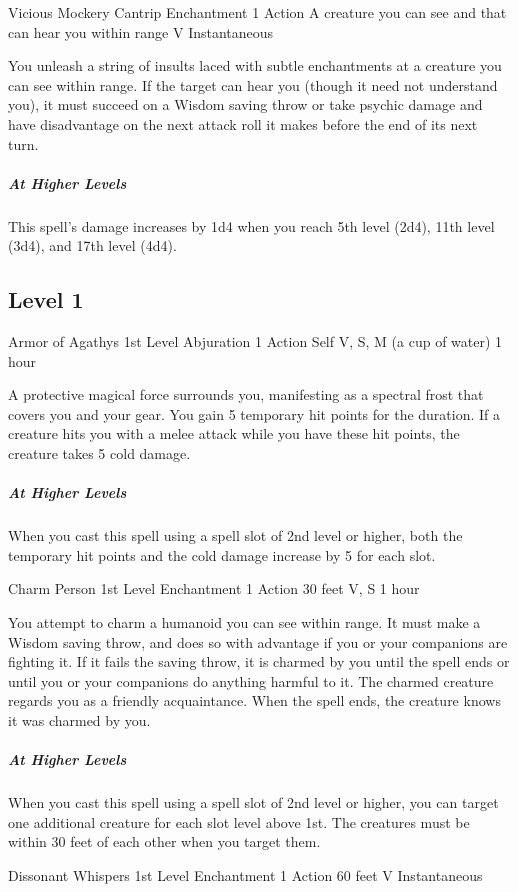 \documentclass[letterpaper,openany,oneside,twocolumn]{book}
\begin{document}
\DndSpellHeader
  {Vicious Mockery}
  {Cantrip Enchantment}
  {1 Action}
  {A creature you can see and that can hear you within range}
  {V}
  {Instantaneous}

You unleash a string of insults laced with subtle enchantments at a creature you can see within range. If the target can hear you (though it need not understand you), it must succeed on a Wisdom saving throw or take  psychic damage and have disadvantage on the next attack roll it makes before the end of its next turn.

\subparagraph*{At Higher Levels} This spell's damage increases by 1d4 when you reach 5th level (2d4), 11th level (3d4), and 17th level (4d4).

\subsection*{Level 1}

\DndSpellHeader
  {Armor of Agathys}
  {1st Level Abjuration}
  {1 Action}
  {Self}
  {V, S, M (a cup of water)}
  {1 hour}
  
A protective magical force surrounds you, manifesting as a spectral frost that covers you and your gear. You gain 5 temporary hit points for the duration. If a creature hits you with a melee attack while you have these hit points, the creature takes 5 cold damage.

\subparagraph*{At Higher Levels} When you cast this spell using a spell slot of 2nd level or higher, both the temporary hit points and the cold damage increase by 5 for each slot.

\DndSpellHeader
  {Charm Person}
  {1st Level Enchantment}
  {1 Action}
  {30 feet}
  {V, S}
  {1 hour}

You attempt to charm a humanoid you can see within range. It must make a Wisdom saving throw, and does so with advantage if you or your companions are fighting it. If it fails the saving throw, it is charmed by you until the spell ends or until you or your companions do anything harmful to it. The charmed creature regards you as a friendly acquaintance. When the spell ends, the creature knows it was charmed by you.

\subparagraph*{At Higher Levels} When you cast this spell using a spell slot of 2nd level or higher, you can target one additional creature for each slot level above 1st. The creatures must be within 30 feet of each other when you target them.

\DndSpellHeader
  {Dissonant Whispers}
  {1st Level Enchantment}
  {1 Action}
  {60 feet}
  {V}
  {Instantaneous}
\end{document}
